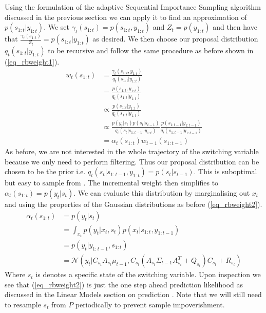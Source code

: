 \documentclass[../masters.tex]{subfiles}
\begin{document}
Using the formulation of the adaptive Sequential Importance Sampling algorithm discussed in the previous section we can apply it to find an approximation of $p(s_{1:t}|y_{1:t})$. We set $\gamma_t(s_{1:t})=p(s_{1:t},y_{1:t})$ and $Z_t=p(y_{1:t})$ and then have that $\frac{\gamma_t(s_{1:t})}{Z_t} = p(s_{1:t}|y_{1:t})$ as desired. We then choose our proposal distribution $q_t(s_{1:t}|y_{1:t})$ to be recursive and follow the same procedure as before shown in (\ref{eq_rbweight1}).
\begin{equation}
\begin{aligned}
w_t(s_{1:t}) &= \frac{\gamma_t(s_{1:t},y_{1:t})}{q_t(s_{1:t}|y_{1:t})} \\
&= \frac{p(s_{1:t},y_{1:t})}{q_t(s_{1:t}|y_{1:t})} \\
&\propto \frac{p(s_{1:t}|y_{1:t})}{q_t(s_{1:t}|y_{1:t})} \\
&\propto \frac{p(y_t|s_t)p(s_t|s_{t-1})}{q_t(s_t|s_{1:t-1},y_{1:t})}\frac{p(s_{1:t-1}|y_{1:t-1})}{q_t(s_{1:t-1}|y_{1:t-1})} \\
&= \alpha_t(s_{1:t})w_{t-1}(s_{1:t-1})
\end{aligned}
\label{eq_rbweight1}
\end{equation}
As before, we are not interested in the whole trajectory of the switching variable because we only need to perform filtering. Thus our proposal distribution can be chosen to be the prior i.e. $q_t(s_t|s_{1:t-1},y_{1:t}) = p(s_t|s_{t-1})$. This is suboptimal but easy to sample from \cite{doucet}. The incremental weight then simplifies to $\alpha_t(s_{1:t}) = p(y_t|s_t)$. We can evaluate this distribution by marginalising out $x_t$ \cite{murphy1} and using the properties of the Gaussian distributions as before (\ref{eq_rbweight2}).
\begin{equation}
\begin{aligned}
\alpha_t(s_{1:t}) &= p(y_t|s_t) \\
&= \int_{x_t} p(y_t|x_t,s_t)p(x_t|s_{1:t},y_{1:t-1}) \\
&= p(y_t|y_{1:t-1}, s_{1:t}) \\
&= \mathcal{N}\left(y_t | C_{s_t}A_{s_t}\mu_{t-1}, C_{s_t}\left(A_{s_t}\Sigma_{t-1}A_{s_t}^T+Q_{s_t} \right)C_{s_t} + R_{s_t} \right)
\end{aligned}
\label{eq_rbweight2}
\end{equation} 
Where $s_t$ is denotes a specific state of the switching variable. Upon inspection we see that (\ref{eq_rbweight2}) is just the one step ahead prediction likelihood as discussed in the Linear Models section on prediction \cite{murphy1}. Note that we will still need to resample $s_t$ from $P$ periodically to prevent sample impoverishment. 
\end{document}
